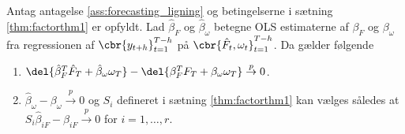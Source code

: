 \begin{thm}
Antag antagelse \ref{ass:forecasting_ligning} og betingelserne i sætning \ref{thm:factorthm1} er opfyldt. 
Lad \(\hat{\beta}_F\) og \(\hat{\beta}_\omega\) betegne OLS estimaterne af \(\beta_F\) og \(\beta_\omega\) fra regressionen af \(\cbr{y_{t+h}}_{t=1}^{T-h}\) på \(\cbr{\hat{F}_t, \omega_t}_{t=1}^{T-h}\). Da gælder følgende
\begin{enumerate}
\item \(\del{\hat{\beta}_F^T \hat{F}_T + \hat{\beta}_\omega \omega_T} - \del{\beta_F^T F_T + \beta_\omega \omega_T} \overset{p}{\rightarrow} 0\).
\item \(\hat{\beta}_\omega - \beta_\omega \overset{p}{\rightarrow} 0\) og \(S_i\) defineret i sætning \ref{thm:factorthm1} kan vælges således at \(S_i \hat{\beta}_{iF} - \beta_{iF} \overset{p}{\rightarrow} 0\) for \(i = 1, \ldots, r\).
\end{enumerate}
\end{thm}
